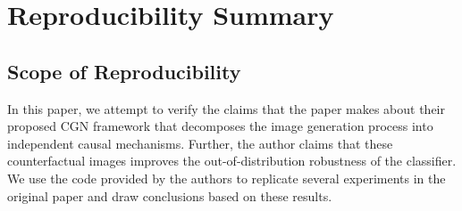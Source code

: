 \section*{\centering Reproducibility Summary}





\subsection*{Scope of Reproducibility}

In this paper, we attempt to verify the claims that the paper \citep{sauer2021counterfactual} makes about their proposed CGN framework that decomposes the image generation process into independent causal mechanisms. Further, the author claims that these counterfactual images improves the out-of-distribution robustness of the classifier. We use the code provided by the authors to replicate several experiments in the original paper and draw conclusions based on these results.  


